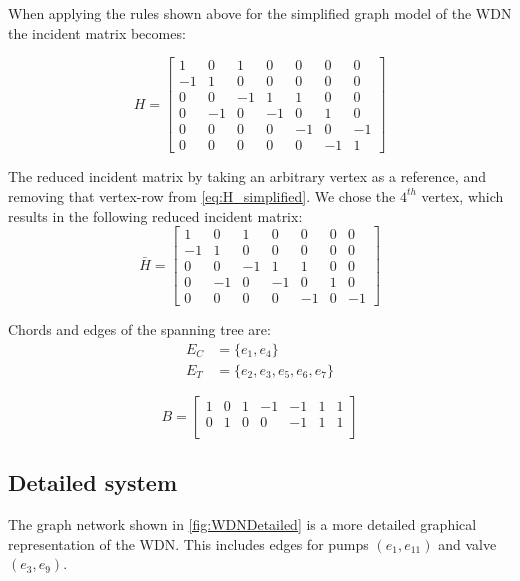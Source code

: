 When applying the rules shown above for the simplified graph model of the WDN the incident matrix becomes:

\begin{equation}
	H = \begin{bmatrix}
		1 & 0 & 1 & 0 & 0 & 0 & 0\\
		-1 & 1 & 0 & 0 & 0 & 0 & 0\\
		0 & 0 & -1 & 1 & 1 & 0 & 0\\
		0 & -1 & 0 & -1 & 0 & 1 & 0\\
		0 & 0 & 0 & 0 & -1 &  0  & -1\\
		0 & 0 & 0 & 0 & 0 & -1 & 1
	\end{bmatrix}
	\label{eq:H_simplified}
\end{equation} 


The reduced incident matrix by taking an arbitrary vertex as a reference, and removing that vertex-row from \cref{eq:H_simplified}. We chose the $4^{th}$ vertex, which results in the following reduced incident matrix:
\begin{equation}
	\bar{H} = \begin{bmatrix}
	1 & 0 & 1 & 0 & 0 & 0 & 0\\
	-1 & 1 & 0 & 0 & 0 & 0 & 0\\
	0 & 0 & -1 & 1 & 1 & 0 & 0\\
	0 & -1 & 0 & -1 & 0 & 1 & 0\\
	0 & 0 & 0 & 0 & -1 &  0  & -1
	\end{bmatrix}
\end{equation}

Chords and edges of the spanning tree are:
\begin{equation} 
	\begin{split}
		E_{C} &= \{e_{1},e_{4}\}   \\ E_{T} &= \{e_2,e_3,e_5,e_6,e_7\}
	\end{split}
\end{equation}


\begin{equation}
	B = \begin{bmatrix}
		1 & 0 & 1 & -1 & -1 & 1 & 1\\
		0 & 1 & 0 & 0 & -1 & 1 & 1\\
	\end{bmatrix}
\end{equation}
\newpage

\subsection{Detailed system}
The graph network shown in \cref{fig:WDNDetailed} is a more detailed graphical representation of the WDN. This includes edges for pumps $(e_{1},e_{11})$ and valve $(e_{3},e_{9})$. 

